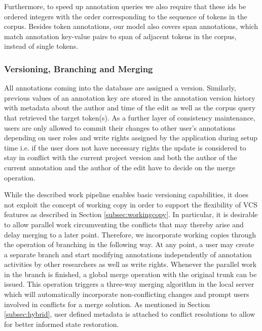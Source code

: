 \documentclass{sig-alternate}
\begin{document}
Furthermore, to speed up annotation queries we also require that these ids be ordered integers
\textemdash with the order corresponding to the sequence of tokens in the corpus.
Besides token annotations, our model also covers span annotations, which match annotation
key-value pairs to span of adjacent tokens in the corpus, instead of single tokens.


\subsubsection{Versioning, Branching and Merging}\label{subsec:dbversion}

All annotations coming into the database are assigned a version. Similarly, previous values
of an annotation key are stored in the annotation version history with metadata about the author
and time of the edit as well as the corpus query that retrieved the target token(s).
As a further layer of consistency maintenance, users are only allowed to commit their changes
to other user's annotations depending on user roles and write rights assigned by the application
during setup time \textemdash i.e. if the user does not have necessary rights the update is
considered to stay in conflict with the current project version and both the author of the
current annotation and the author of the edit have to decide on the merge operation.

While the described work pipeline enables basic versioning capabilities, it does not exploit
the concept of working copy in order to support the flexibility of VCS features as described in
Section \ref{subsec:workingcopy}. In particular, it is desirable to allow parallel work \textemdash
circumventing the conflicts that may thereby arise \textemdash and delay merging to a later point. 
Therefore, we incorporate working copies through the operation of branching in the following way.
At any point, a user may create a separate branch and start modifying annotations independently of
annotation activities by other researchers as well as write rights. Whenever the parallel work in
the branch is finished, a global merge operation with the original trunk can be issued.
This operation triggers a three-way merging algorithm in the local server which will
automatically incorporate non-conflicting changes and prompt users involved in conflicts for
a merge solution. As mentioned in Section \ref{subsec:hybrid}, user defined metadata is attached
to conflict resolutions to allow for better informed state restoration.
\end{document}
